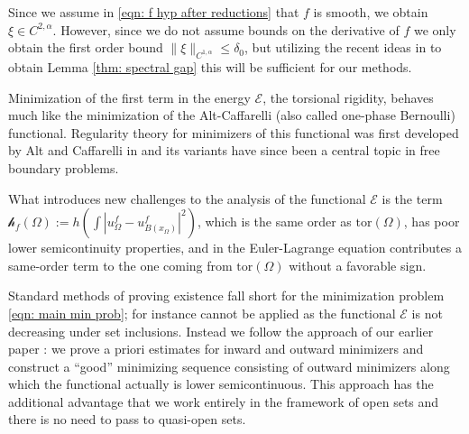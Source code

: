 \documentclass[10pt, reqno]{amsart}
\numberwithin{equation}{section}
\def\W{\Omega}
\def\tor{\mathrm{tor}}
\def\nl{\mathscr{h}_f}
\begin{document}
{Since we assume in \eqref{eqn: f hyp after reductions} that $f$ is smooth, we obtain $\xi \in C^{2,\alpha}$. However, since we do not assume bounds on the derivative of $f$ we only obtain the first order bound $\|\xi\|_{C^{1,\alpha}}\leq \delta_0$, but utilizing the recent ideas in \cite{p24} to obtain Lemma \ref{thm: spectral gap} this will be sufficient for our methods.} 

Minimization of the first term in the energy $\mathcal{E}$, the torsional rigidity, behaves much like the minimization of the Alt-Caffarelli (also called one-phase Bernoulli) functional. Regularity theory for minimizers of this functional was first developed by Alt and Caffarelli in \cite{AC81} and its variants have since been a central topic in free boundary problems. 

What introduces new challenges to the analysis of the functional $\mathcal{E}$ is the term $\nl(\W):= h(\int |u_\W^f - u_{B(x_\W)}^f|^2)$, which is the same order as $\tor(\W)$, has poor lower semicontinuity properties, and in the Euler-Lagrange equation contributes a same-order term to the one coming from $\tor(\W)$ without a favorable sign.

Standard methods of proving existence fall short for the minimization problem \eqref{eqn: main min prob}; for instance 
\cite{BuDalMaso} cannot be applied as the functional $\mathcal{E}$ is not decreasing under set inclusions. Instead we follow the approach of our earlier paper \cite{AKN2}: we prove a priori estimates for inward and outward minimizers and construct a ``good'' minimizing sequence consisting of outward minimizers along which the functional actually is lower semicontinuous. This approach has the additional advantage that we work entirely in the framework of open sets and  there is no  need to pass to quasi-open sets.
\end{document}

